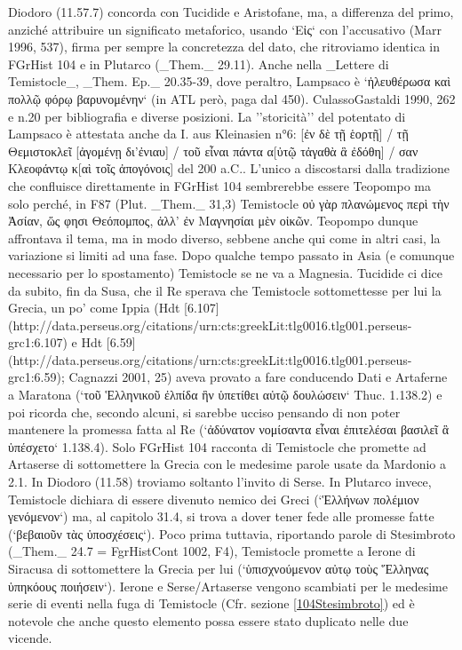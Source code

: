 {             Diodoro (11.57.7) concorda con Tucidide e Aristofane, ma, a differenza del primo, anziché attribuire un significato metaforico, usando `Εἰς` con l'accusativo (Marr 1996, 537), firma per sempre la concretezza  del dato, che ritroviamo identica in FGrHist 104 e in Plutarco (_Them._  29.11). Anche nella _Lettere di Temistocle_, _Them. Ep._  20.35-39,  dove peraltro, Lampsaco è `ἠλευθέρωσα καὶ πολλῷ φόρῳ βαρυνομένην` (in ATL però, paga dal 450). CulassoGastaldi 1990, 262 e n.20 per bibliografia e diverse posizioni. La ''storicità''  del potentato di Lampsaco è attestata anche da I. aus Kleinasien n°6: \textgreek{[ἐν δὲ τῇ ἑορτῇ] / τῇ Θεμιστοκλεῖ [ἀγομένῃ δι'ἐνιαυ] / τοῦ εἶναι πάντα α[ὐτῷ τἀγαθὰ ἃ ἐδόθη] / σαν Κλεοφάντῳ κ[αὶ τοῖς ἀπογόνοις]} del 200 a.C..  L'unico a discostarsi dalla tradizione che confluisce direttamente in FGrHist 104 sembrerebbe essere Teopompo  ma solo perché, in F87 (Plut. _Them._  31,3) Temistocle \textgreek{οὐ γὰρ πλανώμενος περὶ τὴν Ἀσίαν, ὥς φησι Θεόπομπος, ἀλλ’ ἐν Μαγνησίαι μὲν οἰκῶν}. Teopompo  dunque affrontava il tema, ma in modo diverso, sebbene anche qui come in altri casi, la variazione si limiti ad una fase. Dopo qualche tempo passato in Asia (e comunque necessario per lo spostamento) Temistocle se ne va a Magnesia. Tucidide ci dice da subito, fin da Susa, che il Re sperava che Temistocle sottomettesse per lui la Grecia, un po' come Ippia  (Hdt [6.107](http://data.perseus.org/citations/urn:cts:greekLit:tlg0016.tlg001.perseus-grc1:6.107) e Hdt [6.59](http://data.perseus.org/citations/urn:cts:greekLit:tlg0016.tlg001.perseus-grc1:6.59); Cagnazzi 2001, 25) aveva provato a fare conducendo Dati e Artaferne a Maratona (`τοῦ Ἑλληνικοῦ ἐλπίδα ἣν ὑπετίθει αὐτῷ δουλώσειν` Thuc. 1.138.2) e poi ricorda che, secondo alcuni, si sarebbe ucciso pensando di non poter mantenere la promessa fatta al Re (`ἀδύνατον νομίσαντα εἶναι ἐπιτελέσαι βασιλεῖ ἃ ὑπέσχετο` 1.138.4). Solo FGrHist 104 racconta di Temistocle che promette ad Artaserse  di sottomettere la Grecia con le medesime parole usate da Mardonio a 2.1. In  Diodoro (11.58) troviamo soltanto l'invito di Serse. In Plutarco invece, Temistocle dichiara di essere divenuto nemico dei Greci (`Ἑλλήνων πολέμιον γενόμενον`) ma, al capitolo 31.4, si trova a dover tener fede alle promesse fatte (`βεβαιοῦν τὰς ὑποσχέσεις`). Poco prima tuttavia, riportando parole di Stesimbroto (_Them._   24.7 = FgrHistCont 1002, F4), Temistocle promette a Ierone di Siracusa di sottomettere la Grecia per lui (`ὑπισχνούμενον αὐτῳ τοὺς Ἕλληνας ὑπηκόους ποιήσειν`). Ierone e Serse/Artaserse  vengono scambiati per le medesime serie di eventi nella fuga di Temistocle (Cfr. sezione \ref{104Stesimbroto}) ed è notevole che anche questo elemento possa essere stato duplicato nelle due vicende.
}
